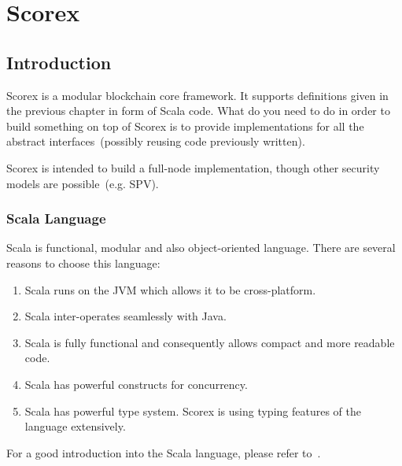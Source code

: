\documentclass[]{report}   %
\begin{document}
%
%
%
%
%

\chapter{Scorex}           
\label{impl}

\section{Introduction}     

Scorex is a modular blockchain core framework. It supports definitions given in the previous chapter in form of Scala code.
What do you need to do in order to build something on top of Scorex is to provide implementations for all the abstract
interfaces~(possibly reusing code previously written).

Scorex is intended to build a full-node implementation, though other security models are possible~(e.g. SPV).

\subsection{Scala Language}

Scala is functional, modular and also object-oriented language. There are several reasons to choose this language:
\begin{enumerate}
	\item Scala runs on the JVM which allows it to be cross-platform.
	\item Scala inter-operates seamlessly with Java.
	\item Scala is fully functional and consequently allows compact and more readable code.
	\item Scala has powerful constructs for concurrency.
	\item Scala has powerful type system. Scorex is using typing features of the language extensively.
\end{enumerate}

For a good introduction into the Scala language, please refer to~\cite{odersky2008programming}.
\end{document}
